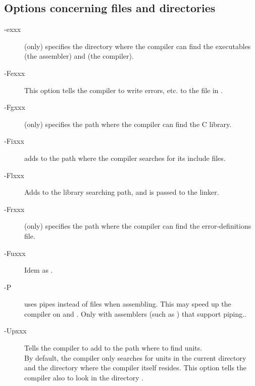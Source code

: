 \documentclass{report}
\newcommand{\olabel}[1]{\label{option:#1}}
\begin{document}
\subsection{Options concerning files and directories}
\begin{description}
\item [-exxx] (\linux only)  specifies the directory where the 
compiler can find the executables  (the assembler) and  (the
compiler).
\olabel{e}
\item [-Fexxx] This option tells the compiler to write errors, etc. to 
the file in .
\olabel{Fe} 
\item [-Fgxxx] (\linux only)  specifies the path where the compiler
can find the \gnu C library.
\olabel{Fg}
\item [-Fixxx] adds  to the path where the compiler searches for
its include files.
\olabel{Fi}
\item [-Flxxx] Adds  to the library searching path, and is passed
to the linker.
\olabel{Fl}
\item [-Frxxx] (\linux only)  specifies the path where the
compiler can find the error-definitions file.
\olabel{Fr}
\item [-Fuxxx] Idem as .
\olabel{Fu}
\item [-P] uses pipes instead of files when assembling. This may speed up
the compiler on \ostwo and \linux. Only with assemblers (such as \gnu
{}) that support piping..
\item [-Upxxx] \olabel{Up} Tells the compiler to add  to the path where to find
units. \\
By default, the compiler only searches for units in the current directory 
and the directory where the compiler itself resides. This option tells the
compiler also to look in the directory .
\end{description}

\end{document}
